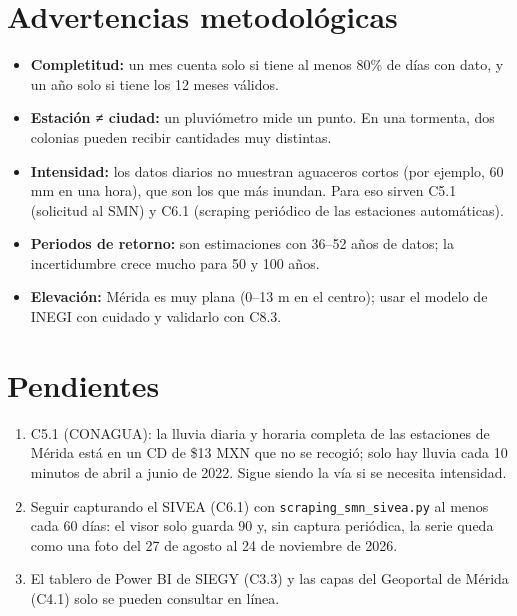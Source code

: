 \documentclass[11pt,a4paper]{article}
\begin{document}
\section{Advertencias metodológicas}
\begin{itemize}[leftmargin=1.2em,itemsep=2pt]
\item \textbf{Completitud:} un mes cuenta solo si tiene al menos 80\% de días con dato, y un año solo si tiene los 12 meses válidos.
\item \textbf{Estación ≠ ciudad:} un pluviómetro mide un punto. En una tormenta, dos colonias pueden recibir cantidades muy distintas.
\item \textbf{Intensidad:} los datos diarios no muestran aguaceros cortos (por ejemplo, 60 mm en una hora), que son los que más inundan.
  Para eso sirven C5.1 (solicitud al SMN) y C6.1 (scraping periódico de las estaciones automáticas).
\item \textbf{Periodos de retorno:} son estimaciones con 36–52 años de datos; la incertidumbre crece mucho para 50 y 100 años.
\item \textbf{Elevación:} Mérida es muy plana (0–13 m en el centro); usar el modelo de INEGI con cuidado y validarlo con C8.3.
\end{itemize}

\section{Pendientes}
\begin{enumerate}[leftmargin=1.4em,itemsep=2pt]
\item C5.1 (CONAGUA): la lluvia diaria y horaria completa de las estaciones de Mérida está en un CD de \$13 MXN que no se recogió; solo hay lluvia cada 10 minutos de abril a junio de 2022. Sigue siendo la vía si se necesita intensidad.
\item Seguir capturando el SIVEA (C6.1) con \texttt{scraping\_smn\_sivea.py} al menos cada 60 días: el visor solo guarda 90 y, sin captura periódica, la serie queda como una foto del 27 de agosto al 24 de noviembre de 2026.
\item El tablero de Power BI de SIEGY (C3.3) y las capas del Geoportal de Mérida (C4.1) solo se pueden consultar en línea.
\end{enumerate}
\end{document}

